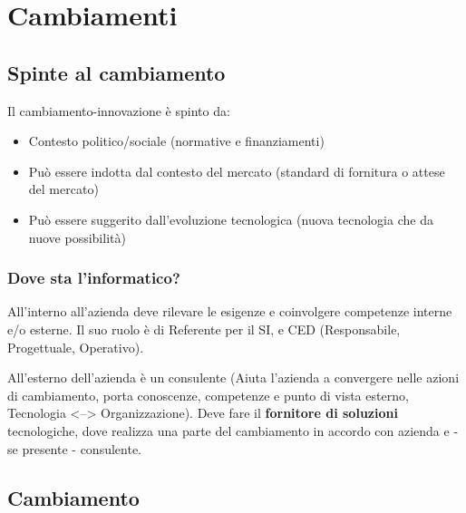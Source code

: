 \chapter{Cambiamenti}

\section{Spinte al cambiamento}

Il cambiamento-innovazione \`e spinto da:

\begin{itemize}
  \item
    Contesto politico/sociale (normative e finanziamenti)
  \item
    Pu\`o essere indotta dal contesto del mercato (standard di fornitura o attese
    del mercato)
  \item
    Pu\`o essere suggerito dall'evoluzione tecnologica (nuova tecnologia che da
    nuove possibilit\`a)
\end{itemize}


\subsection{Dove sta l'informatico?}

All'interno all'azienda deve rilevare le esigenze e coinvolgere competenze
interne e/o esterne. Il suo ruolo \`e di Referente per il SI, e CED
(Responsabile, Progettuale, Operativo).

All'esterno dell'azienda \`e un consulente (Aiuta l'azienda a convergere nelle
azioni di cambiamento, porta conoscenze, competenze e punto di vista esterno,
Tecnologia <--> Organizzazione). Deve fare il \textbf{fornitore di soluzioni}
tecnologiche, dove realizza una parte del cambiamento in accordo con azienda
e - se presente - consulente.

\section{Cambiamento}

